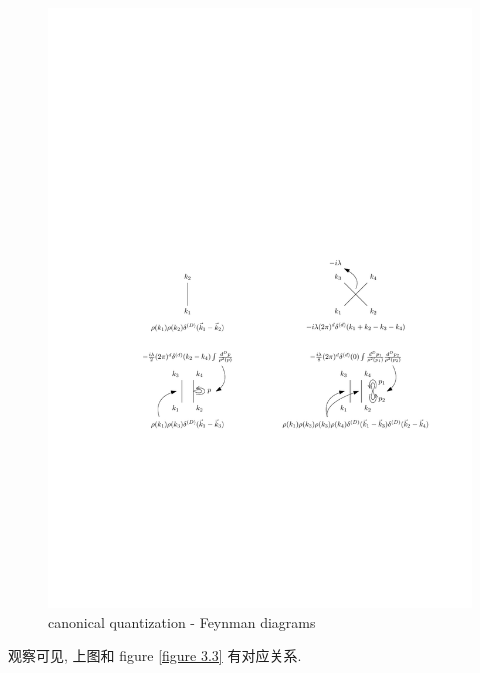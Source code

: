 \begin{itemize}
	\begin{figure}[H]
		\centering
		\includegraphics[scale=1]{figures/canonical quantization - Feynman diagrams.pdf}
		\caption{canonical quantization - Feynman diagrams}
	\end{figure}
	
	观察可见, 上图和 figure \ref{figure 3.3} 有对应关系.
	

\end{itemize}
